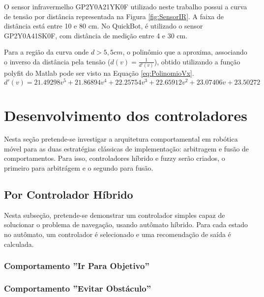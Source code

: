 O sensor infravermelho GP2Y0A21YK0F utilizado neste trabalho possui a curva de
tensão por distância representada na Figura \ref{fig:SensorIR}. A faixa de
distância está entre 10 e 80 cm. No QuickBot, é utilizado o sensor GP2Y0A41SK0F,
com distância de medição entre 4 e 30 cm.



Para a região da curva onde $d > 5,5 cm$, o polinômio que a aproxima, associando
o inverso da distância pela tensão ($d(v) = \frac{1}{d'(v)}$), obtido utilizando
a função polyfit do Matlab pode ser visto na Equação \ref{eq:PolinomioVx}.
\begin{equation}
	\label{eq:PolinomioVx}
	d'(v) = 21.49298 v^5 + 21.86894 v^4 + 22.25754 v^3 + 22.65912 v^2 + 23.07406 v
	+ 23.50272
\end{equation}


\section{Desenvolvimento dos controladores}

	Nesta seção pretende-se investigar a arquitetura comportamental em robótica 
	móvel para as duas estratégias clássicas de implementação: arbitragem e fusão de 
	comportamentos. Para isso, controladores híbrido e fuzzy serão criados, o primeiro
	para arbitrágem e o segundo para fusão.

	\subsection{Por Controlador Híbrido}
	
	Nesta subseção, pretende-se demonstrar um controlador simples capaz de 
	solucionar o problema de navegação, usando autômato híbrido. Para cada estado
	no autômato, um controlador é selecionado e uma recomendação de saída é 
	calculada. 
	
		\subsubsection{Comportamento ''Ir Para Objetivo''}
		
		
		
		\subsubsection{Comportamento ''Evitar Obstáculo''}
		
